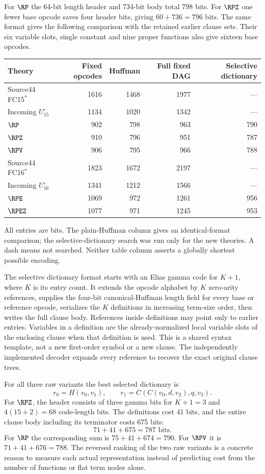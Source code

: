 For $\RP$ the 64-bit length header and 734-bit body total 798 bits.
For $\RPZ$ one fewer base opcode saves four header bits, giving
$60+736=796$ bits. The same format gives the following comparison with
the retained earlier clause sets. Their six variable slots, single
constant and nine proper functions also give sixteen base opcodes.

\begin{center}\small
\begin{tabular}{lrrrr}
\toprule
Theory & Fixed opcodes & Huffman & Full fixed DAG & Selective dictionary\\
\midrule
Source44 FC15$^*$ &1616&1468&1977&---\\
Incoming $U_{15}^{\circ}$ &1134&1020&1342&---\\
$\RP$ &902&798&963&790\\
$\RPZ$ &910&796&951&787\\
$\RPV$ &906&795&966&788\\
\midrule
Source44 FC16$^*$ &1823&1672&2197&---\\
Incoming $U_{16}^{\circ}$ &1341&1212&1566&---\\
$\RPE$ &1069&972&1261&956\\
$\RPEZ$ &1077&971&1245&953\\
\bottomrule
\end{tabular}
\end{center}
All entries are bits. The plain-Huffman column gives an identical-format
comparison; the selective-dictionary search was run only for the new
theories. A dash means not searched. Neither table column asserts a
globally shortest possible encoding.

The selective dictionary format starts with an Elias gamma code for
$K+1$, where $K$ is its entry count. It extends the opcode alphabet by
$K$ zero-arity references, supplies the four-bit canonical-Huffman length
field for every base or reference opcode, serializes the $K$ definitions
in increasing term-size order, then writes the full clause body.
References inside definitions may point only to earlier entries.
Variables in a definition are the already-normalized local variable
slots of the enclosing clause when that definition is used. This is a
shared syntax template, not a new first-order symbol or a new clause.
The independently implemented decoder expands every reference to recover
the exact original clause trees.

For all three raw variants the best selected dictionary is
\[
 r_0=H(v_0,v_1),\qquad
 r_1=C(C(v_0,d,v_2),q,v_3).
\]
For $\RPZ$, the header consists of three gamma bits for $K+1=3$
and $4(15+2)=68$ code-length bits. The definitions cost 41 bits,
and the entire clause body including its terminator costs 675 bits:
\[
 \boxed{71+41+675=787\text{ bits}.}
\]
For $\RP$ the corresponding sum is $75+41+674=790$.
For $\RPV$ it is $71+41+676=788$.
The reversed ranking of the two raw variants is a concrete reason to
measure each actual representation instead of predicting cost from the
number of functions or flat term nodes alone.

